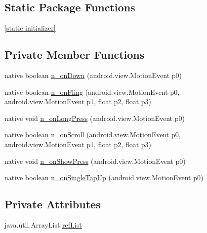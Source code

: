 \subsection*{Static Package Functions}
\begin{CompactItemize}
\item 
\hyperlink{classmd5b60ffeb829f638581ab2bb9b1a7f4f3f_1_1_view_cell_renderer___view_cell_container___long_press_gesture_listener_583c26859d32a57dee03fcfd9462510f}{\mbox{[}static initializer\mbox{]}}
\end{CompactItemize}
\subsection*{Private Member Functions}
\begin{CompactItemize}
\item 
native boolean \hyperlink{classmd5b60ffeb829f638581ab2bb9b1a7f4f3f_1_1_view_cell_renderer___view_cell_container___long_press_gesture_listener_0c2331a1c29c5b49fe34d21d92366186}{n\_\-onDown} (android.view.MotionEvent p0)
\item 
native boolean \hyperlink{classmd5b60ffeb829f638581ab2bb9b1a7f4f3f_1_1_view_cell_renderer___view_cell_container___long_press_gesture_listener_5035021054b194d16ae3bd18d55648b3}{n\_\-onFling} (android.view.MotionEvent p0, android.view.MotionEvent p1, float p2, float p3)
\item 
native void \hyperlink{classmd5b60ffeb829f638581ab2bb9b1a7f4f3f_1_1_view_cell_renderer___view_cell_container___long_press_gesture_listener_2f273b1044d4e846923fc6998501be82}{n\_\-onLongPress} (android.view.MotionEvent p0)
\item 
native boolean \hyperlink{classmd5b60ffeb829f638581ab2bb9b1a7f4f3f_1_1_view_cell_renderer___view_cell_container___long_press_gesture_listener_0bb77079b199f17243758cd7b5db3c3e}{n\_\-onScroll} (android.view.MotionEvent p0, android.view.MotionEvent p1, float p2, float p3)
\item 
native void \hyperlink{classmd5b60ffeb829f638581ab2bb9b1a7f4f3f_1_1_view_cell_renderer___view_cell_container___long_press_gesture_listener_adaa05188181809ba64c31ad3dbad766}{n\_\-onShowPress} (android.view.MotionEvent p0)
\item 
native boolean \hyperlink{classmd5b60ffeb829f638581ab2bb9b1a7f4f3f_1_1_view_cell_renderer___view_cell_container___long_press_gesture_listener_481fed213065d563c5b161e26089f5fe}{n\_\-onSingleTapUp} (android.view.MotionEvent p0)
\end{CompactItemize}
\subsection*{Private Attributes}
\begin{CompactItemize}
\item 
java.util.ArrayList \hyperlink{classmd5b60ffeb829f638581ab2bb9b1a7f4f3f_1_1_view_cell_renderer___view_cell_container___long_press_gesture_listener_ea783de08410c9af7f4759e3e39a8570}{refList}
\end{CompactItemize}


